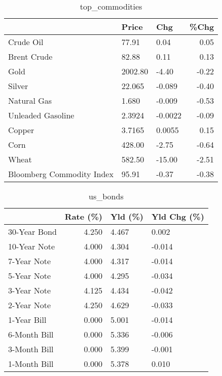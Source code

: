 \documentclass{article}%
\begin{document}
\begin{table}[htbp]%
\caption{top\_commodities}%
\centering%
\begin{adjustbox}{width=1\textwidth}%
\begin{tabular}{lllr}
\toprule
                          &   Price &     Chg &  \%Chg \\
\midrule
               Crude Oil  &   77.91 &    0.04 &  0.05 \\
             Brent Crude  &   82.88 &    0.11 &  0.13 \\
                    Gold  & 2002.80 &   -4.40 & -0.22 \\
                  Silver  &  22.065 &  -0.089 & -0.40 \\
             Natural Gas  &   1.680 &  -0.009 & -0.53 \\
       Unleaded Gasoline  &  2.3924 & -0.0022 & -0.09 \\
                  Copper  &  3.7165 &  0.0055 &  0.15 \\
                    Corn  &  428.00 &   -2.75 & -0.64 \\
                   Wheat  &  582.50 &  -15.00 & -2.51 \\
Bloomberg Commodity Index &   95.91 &   -0.37 & -0.38 \\
\bottomrule
\end{tabular}
%
\end{adjustbox}%
\end{table}

%


\begin{table}[htbp]%
\caption{us\_bonds}%
\centering%
\begin{adjustbox}{width=1\textwidth}%
\begin{tabular}{lrll}
\toprule
             &  Rate (\%) & Yld (\%) & Yld Chg (\%) \\
\midrule
30-Year Bond &     4.250 &   4.467 &       0.002 \\
10-Year Note &     4.000 &   4.304 &      -0.014 \\
 7-Year Note &     4.000 &   4.317 &      -0.014 \\
 5-Year Note &     4.000 &   4.295 &      -0.034 \\
 3-Year Note &     4.125 &   4.434 &      -0.042 \\
 2-Year Note &     4.250 &   4.629 &      -0.033 \\
 1-Year Bill &     0.000 &   5.001 &      -0.014 \\
6-Month Bill &     0.000 &   5.336 &      -0.006 \\
3-Month Bill &     0.000 &   5.399 &      -0.001 \\
1-Month Bill &     0.000 &   5.378 &       0.010 \\
\bottomrule
\end{tabular}
%
\end{adjustbox}%
\end{table}
\end{document}
